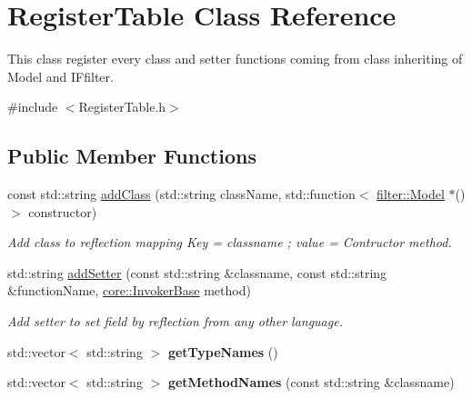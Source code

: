 \hypertarget{class_register_table}{}\section{Register\+Table Class Reference}
\label{class_register_table}


This class register every class and setter functions coming from class inheriting of Model and I\+Ffilter.  




{\ttfamily \#include $<$Register\+Table.\+h$>$}

\subsection*{Public Member Functions}
\begin{DoxyCompactItemize}
\item 
const std\+::string \hyperlink{class_register_table_aa5d0e1a193a71f430e11cd5596e3e2d4}{add\+Class} (std\+::string class\+Name, std\+::function$<$ \hyperlink{classfilter_1_1_model}{filter\+::\+Model} $\ast$()$>$ constructor)
\begin{DoxyCompactList}\small\item\em Add class to reflection mapping Key = classname ; value = Contructor method. \end{DoxyCompactList}\item 
std\+::string \hyperlink{class_register_table_acae6429bdf6b5f5a54a06eb1ebcb6b36}{add\+Setter} (const std\+::string \&classname, const std\+::string \&function\+Name, \hyperlink{classcore_1_1_invoker_base}{core\+::\+Invoker\+Base} method)
\begin{DoxyCompactList}\small\item\em Add setter to set field by reflection from any other language. \end{DoxyCompactList}\item 
\mbox{\label{class_register_table_a168380a772ddd1368d8f977154a20a4f}} 
std\+::vector$<$ std\+::string $>$ {\bfseries get\+Type\+Names} ()
\item 
\mbox{\label{class_register_table_afb677227a335570b1a5e80320078e3d5}} 
std\+::vector$<$ std\+::string $>$ {\bfseries get\+Method\+Names} (const std\+::string \&classname)
\item 
\mbox{\label{class_register_table_a16129b757fc8fc89b33ce32a624c73de}} 

\end{DoxyCompactItemize}

